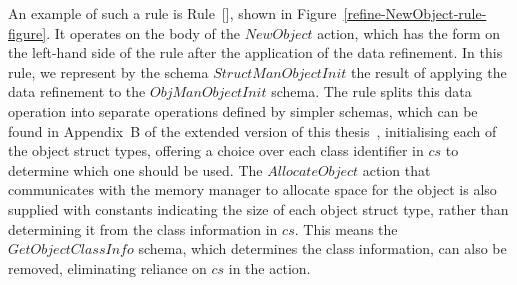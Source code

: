 An example of such a rule is Rule~[],
shown in Figure~\ref{refine-NewObject-rule-figure}.
It operates on the body of the $NewObject$ action, which has the form
on the left-hand side of the rule after the application of the data
refinement.
In this rule, we represent by the schema $StructManObjectInit$ the
result of applying the data refinement to the $ObjManObjectInit$
schema.
The rule splits this data operation into separate operations defined
by simpler schemas, which can be found in Appendix~B of the extended
version of this thesis~\cite{baxter2018-extended}, initialising each
of the object struct types, offering a choice over each class
identifier in $cs$ to determine which one should be used.
The $AllocateObject$ action that communicates with the memory manager
to allocate space for the object is also supplied with constants
indicating the size of each object struct type, rather than
determining it from the class information in $cs$.
This means the $GetObjectClassInfo$ schema, which determines the class
information, can also be removed, eliminating reliance on $cs$ in the
action.

